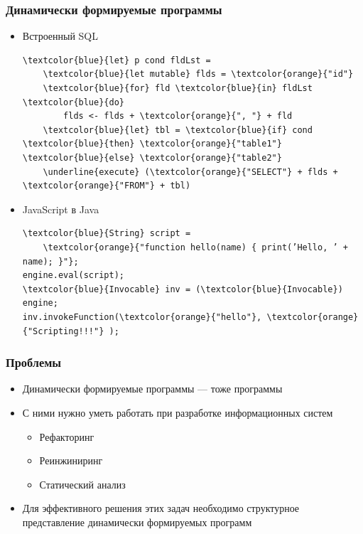 \documentclass{beamer}
\begin{document}
\begin{frame}[fragile]
    \transwipe[direction=90]
    \frametitle{Динамически формируемые программы}
    \begin{itemize}
        \item Встроенный SQL
\begin{Verbatim}[commandchars=\\\{\}]
\textcolor{blue}{let} p cond fldLst =
    \textcolor{blue}{let mutable} flds = \textcolor{orange}{"id"}
    \textcolor{blue}{for} fld \textcolor{blue}{in} fldLst \textcolor{blue}{do}
        flds <- flds + \textcolor{orange}{", "} + fld 
    \textcolor{blue}{let} tbl = \textcolor{blue}{if} cond \textcolor{blue}{then} \textcolor{orange}{"table1"} \textcolor{blue}{else} \textcolor{orange}{"table2"}    
    \underline{execute} (\textcolor{orange}{"SELECT"} + flds + \textcolor{orange}{"FROM"} + tbl)
\end{Verbatim}
        \item JavaScript в Java
\begin{Verbatim}[commandchars=\\\{\}]
\textcolor{blue}{String} script =
    \textcolor{orange}{"function hello(name) { print(’Hello, ’ + name); }"};
engine.eval(script);
\textcolor{blue}{Invocable} inv = (\textcolor{blue}{Invocable}) engine;
inv.invokeFunction(\textcolor{orange}{"hello"}, \textcolor{orange}{"Scripting!!!"} );
\end{Verbatim}
    \end{itemize}

\end{frame}

\begin{frame}
    \transwipe[direction=90]
    \frametitle{Проблемы}
    \begin{itemize}
        \item Динамически формируемые программы --- тоже программы 
        \item С ними нужно уметь работать при разработке информационных систем
        \begin{itemize}
            \item Рефакторинг
            \item Реинжиниринг
            \item Статический анализ
        \end{itemize}
        \item Для эффективного решения этих задач необходимо структурное представление динамически формируемых программ
    \end{itemize}
\end{frame}
\end{document}
